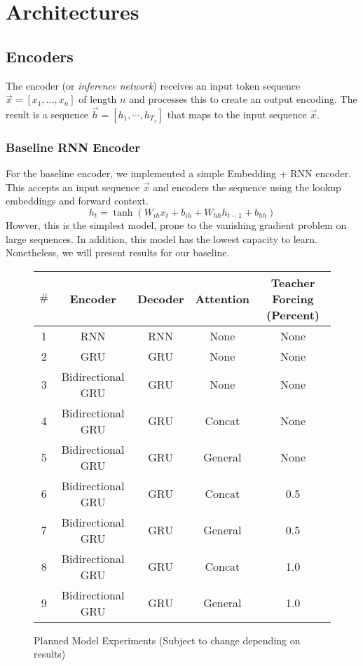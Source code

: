 \documentclass[twoside,twocolumn]{article}
\begin{document}

\section{Architectures}

\subsection{Encoders}
The encoder (or \emph{inference network}) receives an input token sequence
$\vec{x} = \left[{x_1,\hdots, x_n}\right]$ of length $n$ and processes
this to create an output encoding. The result is a sequence
$\vec{h} = \left[{h_1, \cdots, h_{T_x}}\right]$ that
maps to the input sequence $\vec{x}$.
\subsubsection{Baseline RNN Encoder}
For the baseline encoder, we implemented a simple Embedding + RNN encoder.
This accepts an input sequence $\vec{x}$ and encoders the sequence using the lookup
embeddings and forward context.
\begin{equation}
  \label{eq:rnn}
  h_t = \tanh(W_{ih} x_t + b_{ih}  +  W_{hh} h_{t-1} + b_{hh})
\end{equation}
Howver, this is the simplest model, prone to the vanishing gradient problem
on large sequences. In addition, this model has the lowest capacity to learn.
Nonetheless, we will present results for our baseline.

\begin{figure*}[ht]
    \centering
    \begin{tabular}{ |c|c|c|c|c| }
        \hline
        $\#$
          & \textbf{Encoder}
          & \textbf{Decoder}
          & \textbf{Attention}
          & \textbf{Teacher Forcing (Percent)} \\
        \hline
        1 & RNN & RNN & None & None \\ \hline
        2 & GRU & GRU & None & None \\ \hline
        3 & Bidirectional GRU & GRU & None & None \\ \hline
        4 & Bidirectional GRU & GRU & Concat & None \\ \hline
        5 & Bidirectional GRU & GRU & General & None \\ \hline
        6 & Bidirectional GRU & GRU & Concat & 0.5 \\ \hline
        7 & Bidirectional GRU & GRU & General & 0.5 \\ \hline
        8 & Bidirectional GRU & GRU & Concat & 1.0 \\ \hline
        9 & Bidirectional GRU & GRU & General & 1.0 \\ \hline
    \end{tabular}

    \caption{Planned Model Experiments (Subject to change depending on results)}
    \label{fig:model-experiments}
\end{figure*}
\end{document}
